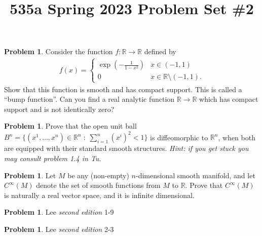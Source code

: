 \documentclass[11pt, reqno]{amsart}
\theoremstyle{definition}
\newtheorem{problem}[thm]{Problem}
\theoremstyle{remark}
\numberwithin{equation}{subsection}
\numberwithin{figure}{section}
\numberwithin{table}{section}
\newcommand{\R}{\mathbb{R}}
\begin{document}
\title{535a Spring 2023 Problem Set \#2} 


\maketitle


\begin{problem}
Consider the function $f: \R \rightarrow \R$ defined by
\begin{align*}
f(x) = \begin{cases}
\exp\left(-\frac{1}{1-x^2}\right) & x \in (-1,1)\\ 
0 & x \in \R \setminus (-1,1).
\end{cases}
\end{align*}
Show that this function is smooth and has compact support. This is called a ``bump function''.
Can you find a real analytic function $\R \rightarrow \R$ which has compact support and is not identically zero?

\end{problem}

\begin{problem}
Prove that the open unit ball $B^n = \{(x^1,\dots,x^n) \in \R^n\;:\; \sum_{i=1}^n (x^i)^2 < 1\}$ is diffeomorphic to $\R^n$, when both are equipped with their standard smooth structures. {\em Hint: if you get stuck you may consult problem 1.4 in Tu.}
\end{problem}

\begin{problem}
Let $M$ be any (non-empty) $n$-dimensional smooth manifold, and let $C^{\infty}(M)$ denote the set of smooth functions from $M$ to $\R$. Prove that $C^{\infty}(M)$ is naturally a real vector space, and it is infinite dimensional.
\end{problem}

\begin{problem} 
Lee {\em second edition} 1-9
\end{problem}


\begin{problem} 
Lee {\em second edition} 2-3
\end{problem}
\end{document}
